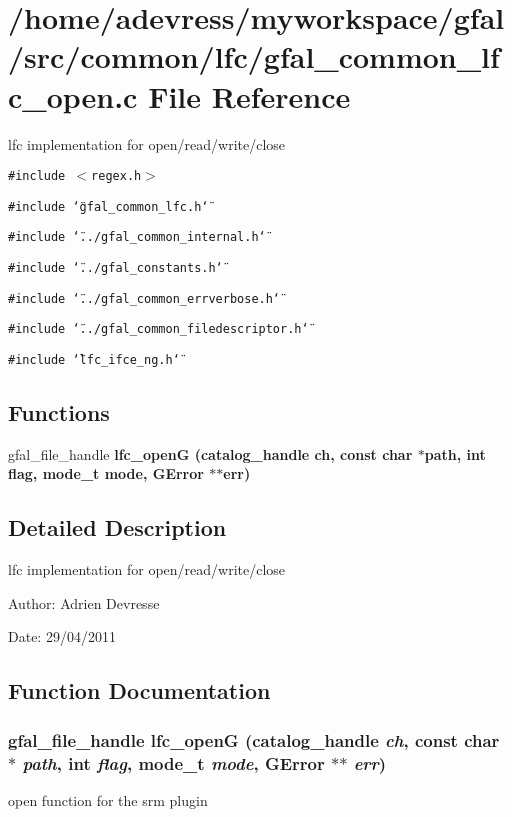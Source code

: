 \section{/home/adevress/myworkspace/gfal/src/common/lfc/gfal\_\-common\_\-lfc\_\-open.c File Reference}
\label{gfal__common__lfc__open_8c}
lfc implementation for open/read/write/close 

{\tt \#include $<$regex.h$>$}\par
{\tt \#include \char`\"{}gfal\_\-common\_\-lfc.h\char`\"{}}\par
{\tt \#include \char`\"{}../gfal\_\-common\_\-internal.h\char`\"{}}\par
{\tt \#include \char`\"{}../gfal\_\-constants.h\char`\"{}}\par
{\tt \#include \char`\"{}../gfal\_\-common\_\-errverbose.h\char`\"{}}\par
{\tt \#include \char`\"{}../gfal\_\-common\_\-filedescriptor.h\char`\"{}}\par
{\tt \#include \char`\"{}lfc\_\-ifce\_\-ng.h\char`\"{}}\par
\subsection*{Functions}
\begin{CompactItemize}
\item 
gfal\_\-file\_\-handle \bf{lfc\_\-open\-G} (catalog\_\-handle ch, const char $\ast$path, int flag, mode\_\-t mode, GError $\ast$$\ast$err)
\end{CompactItemize}


\subsection{Detailed Description}
lfc implementation for open/read/write/close 

\begin{Desc}
\item[Author:]Adrien Devresse \end{Desc}
\begin{Desc}
\item[Date:]29/04/2011 \end{Desc}


\subsection{Function Documentation}
\subsubsection{\setlength{\rightskip}{0pt plus 5cm}gfal\_\-file\_\-handle lfc\_\-open\-G (catalog\_\-handle {\em ch}, const char $\ast$ {\em path}, int {\em flag}, mode\_\-t {\em mode}, GError $\ast$$\ast$ {\em err})}\label{gfal__common__lfc__open_8c_4340e1acda83c339861d2e8c79c0724c}


open function for the srm plugin 